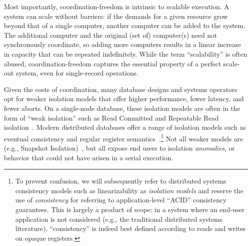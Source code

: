 

 Most importantly,
coordination-freedom is intrinsic to scalable execution. A \cfree
system can scale without barriers: if the demands for a given resource
grow beyond that of a single computer, another computer can be added
to the system. The additional computer and the original (set of)
computer(s) need not synchronously coordinate, so adding more
computers results in a linear increase in capacity that can be
repeated indefinitely. While the term ``scalability'' is often abused,
coordination-freedom captures the essential property of a perfect
scale-out system, even for single-record operations.


 Given the costs of coordination, many
database designs and systems operators opt for weaker isolation models
that offer higher performance, lower latency, and fewer aborts. On a
single-node database, these isolation models are often in the form of
``weak isolation'' such as Read Committed and Repeatable Read
isolation~\cite{adya-isolation}. Modern distributed databases offer a
range of isolation models such as eventual consistency and regular
register semantics~\cite{hat-vldb}.\footnote{To prevent confusion, we
  will subsequently refer to distributed systems consistency models
  such as linearizability as \textit{isolation models} and reserve the
  use of \textit{consistency} for referring to application-level
  ``ACID'' consistency guarantees. This is largely a product of scope:
  in a system where an end-user application is not considered (e.g.,
  the traditional distributed systems literature), ``consistency'' is
  indeed best defined according to reads and writes on opaque
  registers.}  Not all weaker models are \cfree (e.g., Snapshot
Isolation)~\cite{hat-vldb}, but all expose end users to isolation
\textit{anomalies}, or behavior that could not have arisen in a serial
execution.

